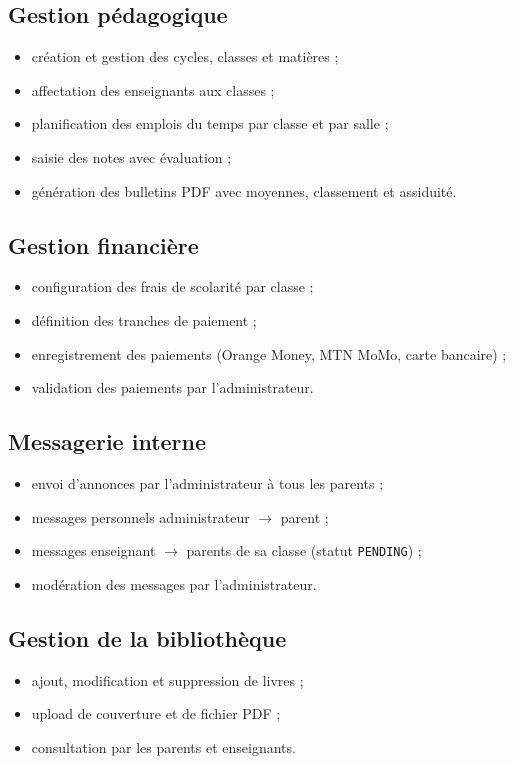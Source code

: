 \documentclass[12pt, a4paper]{report}
\begin{document}
\subsection{Gestion pédagogique}
\begin{itemize}[noitemsep]
    \item création et gestion des cycles, classes et matières ;
    \item affectation des enseignants aux classes ;
    \item planification des emplois du temps par classe et par salle ;
    \item saisie des notes avec évaluation ;
    \item génération des bulletins PDF avec moyennes, classement et assiduité.
\end{itemize}

\subsection{Gestion financière}
\begin{itemize}[noitemsep]
    \item configuration des frais de scolarité par classe ;
    \item définition des tranches de paiement ;
    \item enregistrement des paiements (Orange Money, MTN MoMo, carte bancaire) ;
    \item validation des paiements par l'administrateur.
\end{itemize}

\subsection{Messagerie interne}
\begin{itemize}[noitemsep]
    \item envoi d'annonces par l'administrateur à tous les parents ;
    \item messages personnels administrateur $\rightarrow$ parent ;
    \item messages enseignant $\rightarrow$ parents de sa classe (statut \texttt{PENDING}) ;
    \item modération des messages par l'administrateur.
\end{itemize}

\subsection{Gestion de la bibliothèque}
\begin{itemize}[noitemsep]
    \item ajout, modification et suppression de livres ;
    \item upload de couverture et de fichier PDF ;
    \item consultation par les parents et enseignants.
\end{itemize}
\end{document}
